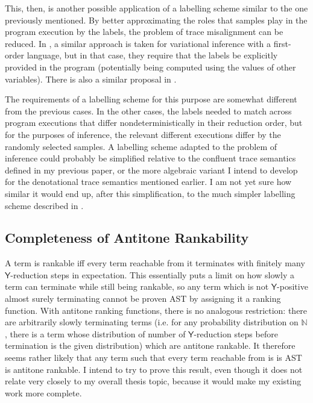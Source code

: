 \documentclass[titlepage]{article}
\newcommand{\tY}{\mathsf{Y}}
\begin{document}
This, then, is another possible application of a labelling scheme similar to the one previously mentioned. By better approximating the roles that samples play in the program execution by the labels, the problem of trace misalignment can be reduced. In \cite{lee2019towards}, a similar approach is taken for variational inference with a first-order language, but in that case, they require that the labels be explicitly provided in the program (potentially being computed using the values of other variables). There is also a similar proposal in \cite{pmlr-v15-wingate11a}.

The requirements of a labelling scheme for this purpose are somewhat different from the previous cases. In the other cases, the labels needed to match across program executions that differ nondeterministically in their reduction order, but for the purposes of inference, the relevant different executions differ by the randomly selected samples. A labelling scheme adapted to the problem of inference could probably be simplified relative to the confluent trace semantics defined in my previous paper, or the more algebraic variant I intend to develop for the denotational trace semantics mentioned earlier. I am not yet sure how similar it would end up, after this simplification, to the much simpler labelling scheme described in \cite{pmlr-v15-wingate11a}.

\subsection{Completeness of Antitone Rankability}
A term is rankable iff every term reachable from it terminates with finitely many $\tY$-reduction steps in expectation. This essentially puts a limit on how slowly a term can terminate while still being rankable, so any term which is not $\tY$-positive almost surely terminating cannot be proven AST by assigning it a ranking function. With antitone ranking functions, there is no analogous restriction: there are arbitrarily slowly terminating terms (i.e. for any probability distribution on $\mathbb N$, there is a term whose distribution of number of $\tY$-reduction steps before termination is the given distribution) which are antitone rankable. It therefore seems rather likely that any term such that every term reachable from is is AST is antitone rankable. I intend to try to prove this result, even though it does not relate very closely to my overall thesis topic, because it would make my existing work more complete.
\end{document}
